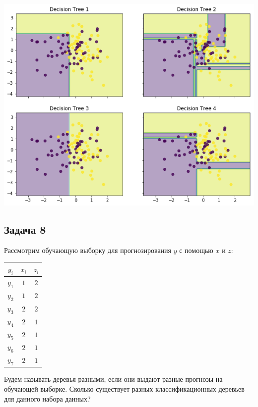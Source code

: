 \documentclass[12pt, a4paper, oneside]{article}
\begin{document}
\begin{center}
	\includegraphics[scale=0.7]{trees.png}
\end{center}





\subsection*{Задача 8} 

Рассмотрим обучающую выборку для прогнозирования $y$ с помощью $x$ и $z$:

\begin{center}
\begin{tabular}{c|c|c}
	$y_i$ & $x_i$ & $z_i$ \\
\hline
	$y_1$ & $1$ & $2$ \\
	$y_2$ & $1$ & $2$ \\
	$y_3$ & $2$ & $2$ \\
	$y_4$ & $2$ & $1$\\
	$y_5$ & $2$ & $1$ \\
	$y_6$ & $2$ & $1$ \\
	$y_7$ & $2$ & $1$ \\
\end{tabular}
\end{center}

Будем называть деревья разными, если они выдают разные прогнозы на обучающей выборке.
Сколько существует разных классификационных деревьев  для данного набора данных?


\end{document}
